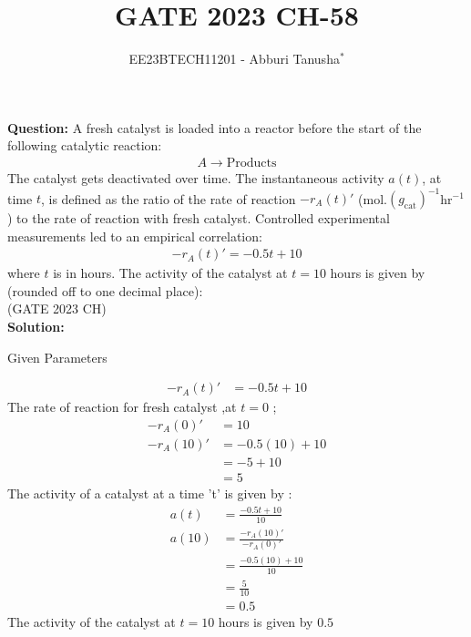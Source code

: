 \documentclass[journal,12pt,twocolumn]{IEEEtran}
\theoremstyle{remark}
\begin{document}

\vspace{3cm}

\title{GATE 2023 CH-58}
\author{EE23BTECH11201 - Abburi Tanusha$^{*}$%
}
\maketitle
\newpage
\bigskip

\renewcommand{\thefigure}{\theenumi}
\renewcommand{\thetable}{\theenumi}

\vspace{3cm}

\maketitle
\textbf{Question:} 
A fresh catalyst is loaded into a reactor before the start of the following catalytic reaction:
\begin{align*}
  A \rightarrow \text{Products} 
\end{align*}
The catalyst gets deactivated over time. The instantaneous activity $a(t)$, at time $t$, is defined as the ratio of the rate of reaction $-r_A(t)'$ (mol.$(g_{\text{cat}})^{-1}$hr$^{-1}$) to the rate of reaction with fresh catalyst. Controlled experimental measurements led to an empirical correlation:
\begin{align*}
 -r_A(t)' = -0.5t + 10
 \end{align*}
where $t$ is in hours.
The activity of the catalyst at $t=10$ hours is given by (rounded off to one decimal place):\\
\hfill(GATE 2023 CH)\\
\textbf{Solution:} 
\begin{table}[h!]
\centering
\resizebox{6cm}{!}{

}
\caption{Given Parameters}
\label{tab:my_label}
\end{table}
\begin{align}
    -r_A(t)' &= -0.5t + 10 
 \end{align}   
 The rate of reaction for fresh catalyst ,at $t=0$ ;
 \begin{align}
    -r_A(0)' &= 10 \\
    -r_A(10)' &= -0.5(10) + 10 \\
              &= -5 + 10 \\
              &= 5
  \end{align}
  The activity of a catalyst at a time 't' is given by :
  \begin{align}            
    a(t) &= \frac{-0.5t+10 }{10} \\
    a(10) &= \frac{-r_A(10)'}{-r_A(0)'} \\
         &= \frac{-0.5(10)+10}{10} \\
          &= \frac{5}{10} \\
          &= 0.5
\end{align}
The activity of the catalyst at $t=10$ hours is given by $0.5$ \\
\end{document}

